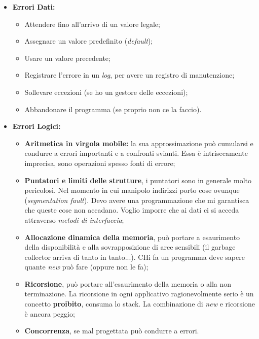 \begin{itemize}

	\item \textbf{Errori Dati:}

	\begin{itemize}

		\item Attendere fino all'arrivo di un valore legale;
		\item Assegnare un valore predefinito (\textit{default});
		\item Usare un valore precedente;
		\item Registrare l'errore in un \textit{log}, per avere un registro di manutenzione;
		\item Sollevare eccezioni (se ho un gestore delle eccezioni);
		\item Abbandonare il programma (se proprio non ce la faccio).

	\end{itemize}
	
	\item \textbf{Errori Logici:}


	\begin{itemize}

		\item \textbf{Aritmetica in virgola mobile:} la sua approssimazione può cumularsi e condurre a errori importanti e a confronti svianti. Essa è intrisecamente imprecisa, sono operazioni spesso fonti di errore;
		\item \textbf{Puntatori e limiti delle strutture}, i puntatori sono in generale molto pericolosi. Nel momento in cui manipolo indirizzi porto cose ovunque (\textit{segmentation fault}). Devo avere una programmazione che mi garantisca che queste cose non accadano. Voglio imporre che ai dati ci si acceda attraverso \textit{metodi di interfaccia};
		\item \textbf{Allocazione dinamica della memoria}, può portare a esaurimento della disponibilità e alla sovrapposizione di aree sensibili (il garbage collector arriva di tanto in tanto...). CHi fa un programma deve sapere quante \textit{new} può fare (oppure non le fa);
		\item \textbf{Ricorsione}, può portare all'esaurimento della memoria o alla non terminazione. La ricorsione in ogni applicativo ragionevolmente serio è un concetto \textbf{proibito}, consuma lo stack. La combinazione di \textit{new} e ricorsione è ancora peggio;
		\item \textbf{Concorrenza}, se mal progettata può condurre a errori.

	\end{itemize}
\end{itemize}


